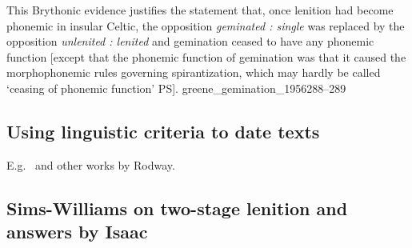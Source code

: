 {This Brythonic evidence justifies the statement that, once lenition had become phonemic in insular Celtic, the opposition \textit{geminated : single} was replaced by the opposition \textit{unlenited : lenited} and gemination ceased to have any phonemic function [except that the phonemic function of gemination was that it caused the morphophonemic rules governing spirantization, which may hardly be called `ceasing of phonemic function' PS].
}{greene_gemination_1956}{288--289}

\subsection{Using linguistic criteria to date texts}
E.g.\ \cite{rodway_dating_2013} and other works by Rodway.
\subsection{Sims-Williams on two-stage lenition and answers by Isaac}
